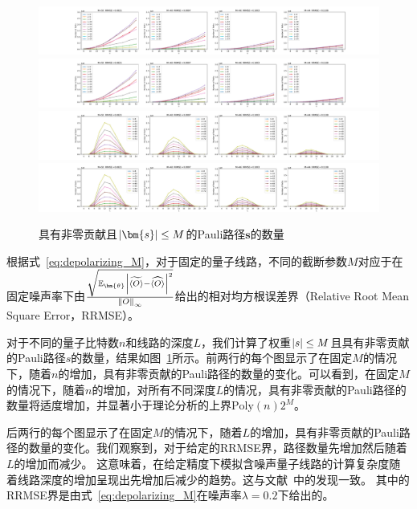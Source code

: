 \begin{figure}[hbp]
    \centering
    \includegraphics[width=\textwidth]{figures/depth_path2_p1}
    \includegraphics[width=\textwidth]{figures/depth_path2_p2}
    \includegraphics[width=\textwidth]{figures/depth_path_p1}
    \includegraphics[width=\textwidth]{figures/depth_path_p2}
    \caption{具有非零贡献且$\abs{\bm{s}}\leq M$的Pauli路径$\bm{s}$的数量}\label{fig:numerical_cost}
\end{figure}

根据式~\eqref{eq:depolarizing_M}，对于固定的量子线路，不同的截断参数$M$对应于在固定噪声率下由$\frac{\sqrt{\mathbb{E}_{\bm{\theta}}\abs{\widetilde{\langle O \rangle}-\widehat{\langle O \rangle}}^2}}{\norm{O}_\infty}$给出的相对均方根误差界（Relative Root Mean Square Error，RRMSE）。

对于不同的量子比特数$n$和线路的深度$L$，我们计算了权重$\abs{s}\leq M$且具有非零贡献的Pauli路径$s$的数量，结果如图~\ref{fig:numerical_cost}所示。前两行的每个图显示了在固定$M$的情况下，随着$n$的增加，具有非零贡献的Pauli路径的数量的变化。可以看到，在固定$M$的情况下，随着$n$的增加，对所有不同深度$L$的情况，具有非零贡献的Pauli路径的数量将适度增加，并显著小于理论分析的上界$\mathrm{Poly}(n)2^M$。


后两行的每个图显示了在固定$M$的情况下，随着$L$的增加，具有非零贡献的Pauli路径的数量的变化。我们观察到，对于给定的RRMSE界，路径数量先增加然后随着$L$的增加而减少。
这意味着，在给定精度下模拟含噪声量子线路的计算复杂度随着线路深度的增加呈现出先增加后减少的趋势。这与文献~\cite{noh2020efficient}中的发现一致。
其中的RRMSE界是由式~\eqref{eq:depolarizing_M}在噪声率$\lambda=0.2$下给出的。


